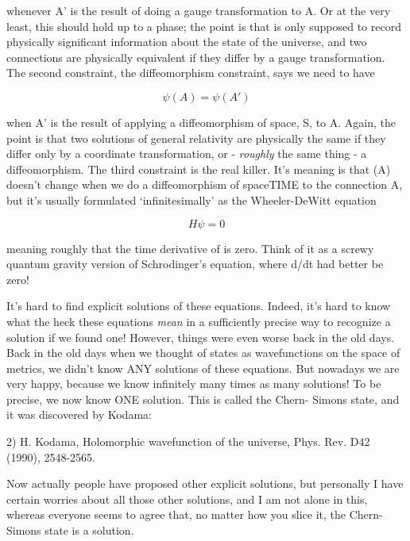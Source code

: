 whenever A' is the result of doing a gauge transformation to A.
Or at the very least, this should hold up to a phase; the point is
that \psi  is only supposed to record physically significant information
about the state of the universe, and two connections are physically
equivalent if they differ by a gauge transformation.  The second
constraint, the diffeomorphism constraint, says we need to have


$$

                     \psi (A) = \psi (A')
$$
    

when A' is the result of applying a diffeomorphism of space, S, to A.
Again, the point is that two solutions of general relativity are physically
the same if they differ only by a coordinate transformation, or -
\emph{roughly} the same thing - a diffeomorphism.   The third constraint
is the real killer.  It's meaning is that \psi (A) doesn't change when we do
a diffeomorphism of spaceTIME to the connection A, but it's usually
formulated `infinitesimally' as the Wheeler-DeWitt equation


$$

                        H \psi  = 0
$$
    

meaning roughly that the time derivative of \psi  is zero.  Think of it
as a screwy quantum gravity version of Schrodinger's equation, where
d\psi /dt had better be zero!

It's hard to find explicit solutions of these equations.  Indeed, it's
hard to know what the heck these equations \emph{mean} in a sufficiently
precise way to recognize a solution if we found one!  However, things 
were even worse back in the old days.  Back in the old days when we 
thought of states as wavefunctions on the space of metrics, we didn't 
know ANY solutions of these equations.  But nowadays we are very
happy, because we know infinitely many times as many solutions!
To be precise, we now know ONE solution.  This is called the Chern-
Simons state, and it was discovered by Kodama:

2) H. Kodama, Holomorphic wavefunction of the universe,
Phys. Rev. D42 (1990), 2548-2565.

Now actually people have proposed other explicit solutions, but
personally I have certain worries about all those other solutions,
and I am not alone in this, whereas everyone seems to agree that, no
matter how you slice it, the Chern-Simons state is a solution.

